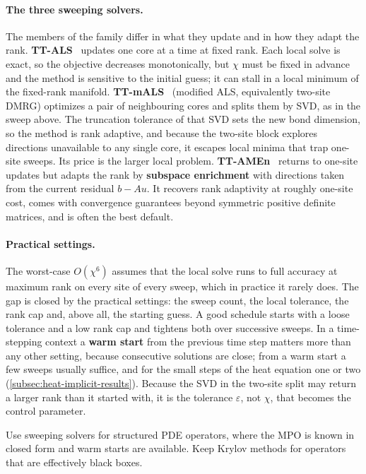 \paragraph{The three sweeping solvers.}
The members of the family differ in what they update and in how they adapt the
rank. \textbf{TT-ALS}~\cite{Holtz2012} updates one core at a time at fixed rank.
Each local solve is exact, so the objective decreases monotonically, but $\chi$
must be fixed in advance and the method is sensitive to the initial guess; it
can stall in a local minimum of the fixed-rank manifold.
\textbf{TT-mALS}~\cite{Holtz2012} (modified ALS, equivalently two-site DMRG)
optimizes a pair of neighbouring cores and splits them by SVD, as in the sweep
above. The truncation tolerance of that SVD sets the new bond dimension, so the
method is rank adaptive, and because the two-site block explores directions
unavailable to any single core, it escapes local minima that trap one-site
sweeps. Its price is the larger local problem. \textbf{TT-AMEn}~\cite{Dolgov2014}
returns to one-site updates but adapts the rank by \textbf{subspace enrichment}
with directions taken from the current residual $b - Au$. It recovers rank
adaptivity at roughly one-site cost, comes with convergence guarantees beyond
symmetric positive definite matrices, and is often the best default.

\paragraph{Practical settings.}
The worst-case $O(\chi^6)$ assumes that the local solve runs to full accuracy at
maximum rank on every site of every sweep, which in practice it rarely does. The
gap is closed by the practical settings: the sweep count, the local tolerance,
the rank cap and, above all, the starting guess. A good schedule starts with a
loose tolerance and a low rank cap and tightens both over successive sweeps. In
a time-stepping context a \textbf{warm start} from the previous time step
matters more than any other setting, because consecutive solutions are close;
from a warm start a few sweeps usually suffice, and for the small steps of the
heat equation one or two (\cref{subsec:heat-implicit-results}). Because the SVD in the
two-site split may return a larger rank than it started with, it is the
tolerance $\varepsilon$, not $\chi$, that becomes the control parameter.

\begin{remark}
  Use sweeping solvers for structured PDE operators, where the MPO is known in
  closed form and warm starts are available. Keep Krylov methods for operators
  that are effectively black boxes.
\end{remark}

